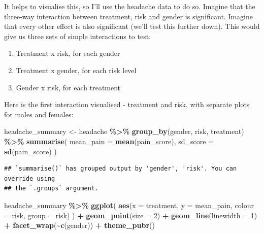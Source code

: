 \documentclass[
]{book}
\newenvironment{Shaded}{\begin{snugshade}}{\end{snugshade}}
\newcommand{\AttributeTok}[1]{\textcolor[rgb]{0.13,0.29,0.53}{#1}}
\newcommand{\DecValTok}[1]{\textcolor[rgb]{0.00,0.00,0.81}{#1}}
\newcommand{\FunctionTok}[1]{\textcolor[rgb]{0.13,0.29,0.53}{\textbf{#1}}}
\newcommand{\NormalTok}[1]{#1}
\newcommand{\OtherTok}[1]{\textcolor[rgb]{0.56,0.35,0.01}{#1}}
\newcommand{\SpecialCharTok}[1]{\textcolor[rgb]{0.81,0.36,0.00}{\textbf{#1}}}
\providecommand{\tightlist}{%
  \setlength{\itemsep}{0pt}\setlength{\parskip}{0pt}}
\begin{document}
It helps to visualise this, so I'll use the headache data to do so. Imagine that the three-way interaction between treatment, risk and gender is significant. Imagine that every other effect is also significant (we'll test this further down). This would give us three sets of simple interactions to test:

\begin{enumerate}
\def\labelenumi{\arabic{enumi}.}
\tightlist
\item
  Treatment x risk, for each gender
\item
  Treatment x gender, for each risk level
\item
  Gender x risk, for each treatment
\end{enumerate}

Here is the first interaction visualised - treatment and risk, with separate plots for males and females:

\begin{Shaded}
\begin{Highlighting}[]
\NormalTok{headache\_summary }\OtherTok{\textless{}{-}}\NormalTok{ headache }\SpecialCharTok{\%\textgreater{}\%}
  \FunctionTok{group\_by}\NormalTok{(gender, risk, treatment) }\SpecialCharTok{\%\textgreater{}\%}
  \FunctionTok{summarise}\NormalTok{(}
    \AttributeTok{mean\_pain =} \FunctionTok{mean}\NormalTok{(pain\_score),}
    \AttributeTok{sd\_score =} \FunctionTok{sd}\NormalTok{(pain\_score)}
\NormalTok{  ) }
\end{Highlighting}
\end{Shaded}

\begin{verbatim}
## `summarise()` has grouped output by 'gender', 'risk'. You can override using
## the `.groups` argument.
\end{verbatim}

\begin{Shaded}
\begin{Highlighting}[]
\NormalTok{headache\_summary }\SpecialCharTok{\%\textgreater{}\%}
  \FunctionTok{ggplot}\NormalTok{(}
    \FunctionTok{aes}\NormalTok{(}\AttributeTok{x =}\NormalTok{ treatment, }\AttributeTok{y =}\NormalTok{ mean\_pain, }\AttributeTok{colour =}\NormalTok{ risk, }\AttributeTok{group =}\NormalTok{ risk)}
\NormalTok{  ) }\SpecialCharTok{+}
  \FunctionTok{geom\_point}\NormalTok{(}\AttributeTok{size =} \DecValTok{2}\NormalTok{) }\SpecialCharTok{+}
  \FunctionTok{geom\_line}\NormalTok{(}\AttributeTok{linewidth =} \DecValTok{1}\NormalTok{) }\SpecialCharTok{+}
  \FunctionTok{facet\_wrap}\NormalTok{(}\SpecialCharTok{\textasciitilde{}}\FunctionTok{c}\NormalTok{(gender)) }\SpecialCharTok{+}
  \FunctionTok{theme\_pubr}\NormalTok{()}
\end{Highlighting}
\end{Shaded}
\end{document}
